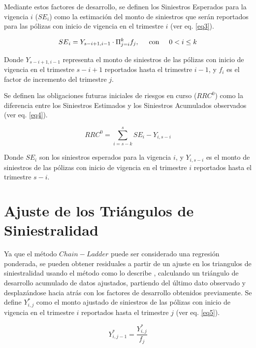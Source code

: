 \documentclass[11pt,twoside,openright,spanish]{report}
\numberwithin{equation}{chapter}
\numberwithin{figure}{chapter}
\numberwithin{table}{chapter}
\begin{document}
	Mediante estos factores de desarrollo, se definen los Siniestros Esperados para la vigencia $i$ (${SE}_{i}$) como la estimación del monto de siniestros que serán reportados para las pólizas con inicio de vigencia en el trimestre $i$ (ver eq. \ref{eq3}).
	
	\begin{equation}
	{SE}_{i}={Y}_{s-i+1,i-1}\cdot\Pi_{j=i}^{k}{f}_{j},\hspace{0.5cm}\text{con}\hspace{0.5cm}0< i\le k
		\label{eq3}
	\end{equation}

	Donde ${Y}_{s-i+1,i-1}$ representa el monto de siniestros de las pólizas con inicio de vigencia en el trimestre $s-i+1$ reportados hasta el trimestre $i-1$, y ${f}_{i}$ es el factor de incremento del trimestre $j$. 

	Se definen las obligaciones futuras iniciales de riesgos en curso (${RRC}^{0}$) como la diferencia entre los Siniestros Estimados y los Siniestros Acumulados observados (ver eq. \ref{eq4}).
	
	\begin{equation}
	{RRC}^{0}=\sum _{i=s-k}^{s}{SE}_{i}-{Y}_{i,s-i}
	\label{eq4}
	\end{equation}

	Donde ${SE}_{i}$ son los siniestros esperados para la vigencia $i$, y ${Y}_{i,s-i}$ es el monto de siniestros de las pólizas con inicio de vigencia en el trimestre $i$ reportados hasta el trimestre $s-i$.
		 
\section{Ajuste de los Triángulos de Siniestralidad}		 
		 
Ya que el método $Chain-Ladder$ puede ser considerado una regresión ponderada, se pueden obtener residuales a partir de un ajuste en los triangulos de siniestralidad usando el método como lo describe \citet{QLowe}, calculando un triángulo de desarrollo acumulado de datos ajustados, partiendo del último dato observado y desplazándose hacia atrás con los factores de desarrollo obtenidos previamente. Se define ${Y}_{i,j}^{*}$ como el monto ajustado de siniestros de las pólizas con inicio de vigencia en el trimestre $i$ reportados hasta el trimestre $j$ (ver eq. \ref{eq5}).
	
		\begin{equation}
	{Y}_{i,j-1}^{*}=\frac{{Y}_{i,j}^{*}}{{f}_{j}}
	\label{eq5}
	\end{equation}
\end{document}
